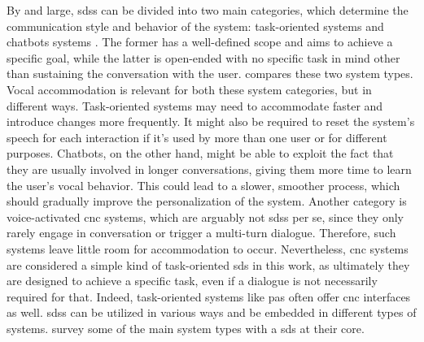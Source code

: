 By and large, \acp{sds} can be divided into two main categories, which determine the communication style and behavior of the system: task-oriented systems \citep[e.g.,][]{Wen2016network, Zhao2016towards} and chatbots systems \citep[e.g.,][]{Vinyals2015neural, Li2016deep}.
The former has a well-defined scope and aims to achieve a specific goal, while the latter is open-ended with no specific task in mind other than sustaining the conversation with the user.
 compares these two system types.
Vocal accommodation is relevant for both these system categories, but in different ways.
Task-oriented systems may need to accommodate faster and introduce changes more frequently.
It might also be required to reset the system's speech for each interaction if it's used by more than one user or for different purposes.
Chatbots, on the other hand, might be able to exploit the fact that they are usually involved in longer conversations, giving them more time to learn the user's vocal behavior.
This could lead to a slower, smoother process, which should gradually improve the personalization of the system.
Another category is voice-activated \acf{cnc} systems, which are arguably not \acp{sds} per se, since they only rarely engage in conversation or trigger a multi-turn dialogue.
Therefore, such systems leave little room for accommodation to occur.
Nevertheless, \ac{cnc} systems are considered a simple kind of task-oriented \ac{sds} in this work, as ultimately they are designed to achieve a specific task, even if a dialogue is not necessarily required for that.
Indeed, task-oriented systems like \acp{pa} often offer \ac{cnc} interfaces as well.
\Acp{sds} can be utilized in various ways and be embedded in different types of systems.
 survey some of the main system types with a \ac{sds} at their core.
%
